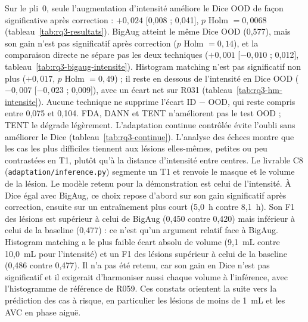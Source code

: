 Sur le pli~0, seule l'augmentation d'intensité améliore le Dice OOD de façon significative après correction : $+0{,}024$ [0,008 ; 0,041], $p$ Holm $= 0{,}0068$ (tableau~\ref{tab:rq3-resultats}).
BigAug atteint le même Dice OOD (0,577), mais son gain n'est pas significatif après correction ($p$ Holm $= 0{,}14$), et la comparaison directe ne sépare pas les deux techniques ($+0{,}001$ [$-0{,}010$ ; 0,012], tableau~\ref{tab:rq3-bigaug-intensite}).
Histogram matching n'est pas significatif non plus ($+0{,}017$, $p$ Holm $= 0{,}49$) ; il reste en dessous de l'intensité en Dice OOD ($-0{,}007$ [$-0{,}023$ ; 0,009]), avec un écart net sur R031 (tableau~\ref{tab:rq3-hm-intensite}).
Aucune technique ne supprime l'écart ID $-$ OOD, qui reste compris entre 0,075 et 0,104.
FDA, DANN et TENT n'améliorent pas le test OOD ; TENT le dégrade légèrement.
L'adaptation continue contrôlée évite l'oubli sans améliorer le Dice (tableau~\ref{tab:rq3-continue}).
L'analyse des échecs montre que les cas les plus difficiles tiennent aux lésions elles-mêmes, petites ou peu contrastées en T1, plutôt qu'à la distance d'intensité entre centres.
Le livrable C8 (\nolinkurl{adaptation/inference.py}) segmente un T1 et renvoie le masque et le volume de la lésion.
Le modèle retenu pour la démonstration est celui de l'intensité.
À Dice égal avec BigAug, ce choix repose d'abord sur son gain significatif après correction, ensuite sur un entraînement plus court (5,0~h contre 8,1~h).
Son F1 des lésions est supérieur à celui de BigAug (0,450 contre 0,420) mais inférieur à celui de la baseline (0,477) : ce n'est qu'un argument relatif face à BigAug.
Histogram matching a le plus faible écart absolu de volume (9,1~mL contre 10,0~mL pour l'intensité) et un F1 des lésions supérieur à celui de la baseline (0,486 contre 0,477).
Il n'a pas été retenu, car son gain en Dice n'est pas significatif et il exigerait d'harmoniser aussi chaque volume à l'inférence, avec l'histogramme de référence de R059.
Ces constats orientent la suite vers la prédiction des cas à risque, en particulier les lésions de moins de 1~mL et les AVC en phase aiguë.
